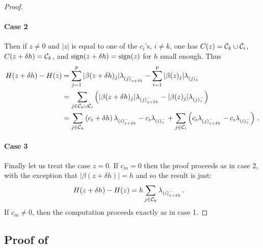 \begin{proof}
  \paragraph{Case 2}
  Then if  $z \neq 0$ and $|z|$ is equal to one of the $c_i$'s, $i \neq k$,  one has $C(z) = \mathcal{C}_k \cup \mathcal{C}_i$, $C(z + \delta h) = \mathcal{C}_k$, and $\operatorname{sign}(z + \delta h) = \operatorname{sign}(z)$ for $h$ small enough.
  Thus
  \begin{align}
    H(z + \delta h) - H(z)
      &= \sum_{j =1}^p |\beta(z + \delta h)_j| \lambda_{(j)^-_{z + \delta h}}
          - \sum_{i=1}^p |\beta(z)_j| \lambda_{(j)^-_z}  \nonumber \\
      &= \sum_{j \in \mathcal{C}_k \cup \mathcal{C}_i} \left( |\beta(z + \delta h)_j| \lambda_{(j)^-_{z + \delta h}}
         - |\beta(z)_j| \lambda_{(j)^-_z} \right)  \nonumber \\
      &= \sum_{j \in \mathcal{C}_k} \left( c_i + \delta h \right) \lambda_{(i)^-_{z + \delta h}}
           - c_i \lambda_{(i)^-_z}
           + \sum_{j \in \mathcal{C}_i} \left( c_i \lambda_{(j)^-_{z + \delta h}}
           - c_i \lambda_{(i)^-_z} \right) \, .
  \end{align}

  \paragraph{Case 3} Finally let us treat the case $z = 0$.
  If $c_m = 0$ then the proof proceeds as in case 2, with the exception that $|\beta(z + \delta h)| = h$ and so the result is just:
  \begin{align}
    H(z + \delta h) - H(z)
      &= h \sum_{j \in \mathcal{C}_k} \lambda_{(i)^-_{z + \delta h}} \, .
  \end{align}
  If $c_m \neq 0$, then the computation proceeds exactly as in case 1.
\end{proof}

\subsection{Proof of }

